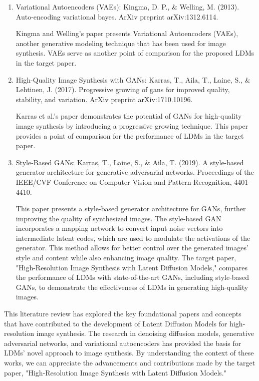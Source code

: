 \documentclass{article}
\begin{document}
\begin{enumerate}
    \item Variational Autoencoders (VAEs):
Kingma, D. P., \& Welling, M. (2013). Auto-encoding variational bayes. ArXiv preprint arXiv:1312.6114. \newline

Kingma and Welling's paper presents Variational Autoencoders (VAEs), another generative modeling technique that has been used for image synthesis. VAEs serve as another point of comparison for the proposed LDMs in the target paper.\newline

    \item High-Quality Image Synthesis with GANs:
Karras, T., Aila, T., Laine, S., \& Lehtinen, J. (2017). Progressive growing of gans for improved quality, stability, and variation. ArXiv preprint arXiv:1710.10196.\newline

Karras et al.'s paper demonstrates the potential of GANs for high-quality image synthesis by introducing a progressive growing technique. This paper provides a point of comparison for the performance of LDMs in the target paper.\newline

    \item Style-Based GANs:
Karras, T., Laine, S., \& Aila, T. (2019). A style-based generator architecture for generative adversarial networks. Proceedings of the IEEE/CVF Conference on Computer Vision and Pattern Recognition, 4401-4410.\newline

This paper presents a style-based generator architecture for GANs, further improving the quality of synthesized images. The style-based GAN incorporates a mapping network to convert input noise vectors into intermediate latent codes, which are used to modulate the activations of the generator. This method allows for better control over the generated images' style and content while also enhancing image quality. The target paper, "High-Resolution Image Synthesis with Latent Diffusion Models," compares the performance of LDMs with state-of-the-art GANs, including style-based GANs, to demonstrate the effectiveness of LDMs in generating high-quality images.\newline
\end{enumerate}

This literature review has explored the key foundational papers and concepts that have contributed to the development of Latent Diffusion Models for high-resolution image synthesis. The research in denoising diffusion models, generative adversarial networks, and variational autoencoders has provided the basis for LDMs' novel approach to image synthesis. By understanding the context of these works, we can appreciate the advancements and contributions made by the target paper, "High-Resolution Image Synthesis with Latent Diffusion Models."
\end{document}
